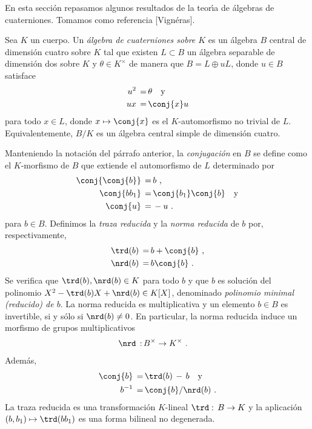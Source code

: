 \newtheorem*{teoClassificationSurUnCorpsLocal}{Teorema}
\newtheorem*{teoClassificationSurUnCorpsGlobal}{Teorema}
\newtheorem*{propoMaxOrdInvertible}{Proposici\'{o}n}
\newtheorem*{propoInvertibleImplicaPrincipal}{Proposici\'{o}n}
\newtheorem*{propoLatticesSplitAlg}{Proposici\'{o}n}
\newtheorem*{propoLatticesSplitAlgCont}{Proposici\'{o}n}
\newtheorem*{teoMaxOrdsSplitAlg}{Teorema}
\newtheorem*{propoOrdEichlerSplitAlg}{Proposici\'{o}n}

\theoremstyle{remark}
\newtheorem*{obsConjugadosEInversos}{Observaci\'{o}n}

En esta secci\'{o}n repasamos algunos resultados de la teor\'{\i}a de
\'{a}lgebras de cuaterniones. Tomamos como referencia [Vign\'{e}ras].

Sea $K$ un cuerpo. Un \emph{\'{a}lgebra de cuaterniones sobre $K$} es un
\'{a}lgebra $B$ central de dimensi\'{o}n cuatro sobre $K$ tal que existen
$L\subset B$ un \'{a}lgebra separable de dimensi\'{o}n dos sobre $K$ y
$\theta\in K^{\times}$ de manera que $B=L\oplus uL$, donde $u\in B$ satisface
\begin{align*}
 u^{2} \,=\, & \theta\quad\text{y} \\
 ux \,=\, & \conj{x}u
\end{align*}
%
para todo $x\in L$, donde $x\mapsto \conj{x}$ es el $K$-automorfismo
no trivial de $L$. Equivalentemente, $B/K$ es un \'{a}lgebra central simple
de dimensi\'{o}n cuatro.

Manteniendo la notaci\'{o}n del p\'{a}rrafo anterior, la
\emph{conjugaci\'{o}n} en $B$ se define como el $K$-morfismo de $B$ que
extiende el automorfismo de $L$ determinado por
\begin{align*}
 \conj{\conj{b}} \,=\, & b\text{ ,} \\
 \conj{bb_{1}} \,=\, & \conj{b_{1}}\conj{b}\quad\text{y} \\
 \conj{u} \,=\, & -u\text{ .}
\end{align*}
%
para $b\in B$. Definimos la \emph{traza reducida} y la \emph{norma reducida}
de $b$ por, respectivamente,
\begin{align*}
 \trd(b)\,=\, & b+\conj{b}\text{ ,}\\
 \nrd(b)\,=\, & b\conj{b}\text{ .}
\end{align*}
%
Se verifica que $\trd(b),\nrd(b)\in K$ para todo $b$ y que $b$ es
soluci\'{o}n del polinomio $X^{2}-\trd(b)X+\nrd(b)\in K[X]$, denominado
\emph{polinomio minimal (reducido) de $b$}. La norma reducida es
multiplicativa y un elemento $b\in B$ es invertible, si y s\'{o}lo si
$\nrd(b)\not =0$. En particular, la norma reducida induce un morfismo de
grupos multiplicativos
\begin{align*}
 \nrd\,:\, & B^{\times}\rightarrow K^{\times}
 \text{ .}
\end{align*}
%
Adem\'{a}s,
\begin{align*}
 \conj{b} \,=\, & \trd(b)\,-\,b\quad\text{y}\\
 b^{-1} \,=\, & \conj{b}/\nrd(b)\text{ .}
\end{align*}
%
La traza reducida es una transformaci\'{o}n $K$-lineal $\trd :\,B\rightarrow K$
y la aplicaci\'{o}n $(b,b_{1})\mapsto \trd(bb_{1})$ es una forma bilineal
no degenerada.

